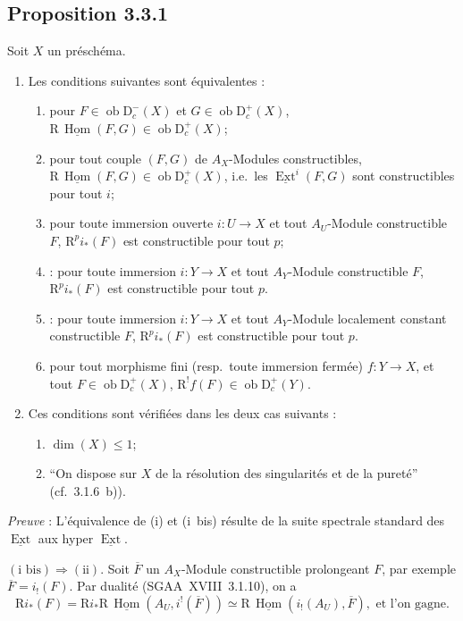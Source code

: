 \documentclass[11pt]{article}
\DeclareMathOperator{\Hom}{Hom}
\DeclareMathOperator{\Ext}{Ext}
\newcommand{\R}{\mathrm{R}}\newcommand{\RHomCore}{\mathrm{RHom}}
\newcommand{\D}{\mathrm{D}}
\newcommand{\ob}{\operatorname{ob}}
\newcommand{\ol}[1]{\overline{#1}}
\providecommand{\Hom}{\operatorname{Hom}}
\providecommand{\ob}{\operatorname{ob}}
\providecommand{\R}{\mathrm R}
\providecommand{\Hom}{\operatorname{Hom}}
\begin{document}
\subsection*{Proposition 3.3.1}
Soit $X$ un préschéma.
\begin{enumerate}
\item[a)] Les conditions suivantes sont équivalentes :
\begin{enumerate}
\item[(i)] pour $F \in \ob \D_c^{-}(X)$ et $G \in \ob \D_c^{+}(X)$, $\R\,\underline{\Hom}(F,G) \in \ob \D_c^{+}(X)$;
\item[(i~bis)] pour tout couple $(F,G)$ de $A_X$-Modules constructibles, $\R\,\underline{\Hom}(F,G) \in \ob \D_c^{+}(X)$, i.e.~les $\underline{\Ext}^i(F,G)$ sont constructibles pour tout $i$;
\item[(ii)] pour
toute immersion ouverte $i : U \to X$ et tout $A_U$-Module constructible $F$, $\mathrm{R}^p i_{*}(F)$ est constructible pour tout $p$;
\item[(ii~bis)] : pour toute immersion $i : Y \to X$ et tout $A_Y$-Module constructible $F$, $\mathrm{R}^p i_{*}(F)$ est constructible pour tout $p$.
\item[(ii~ter)] : pour toute immersion $i : Y \to X$ et tout $A_Y$-Module localement constant constructible $F$, $\mathrm{R}^p i_{*}(F)$ est constructible pour tout $p$.
\item[(iii)] pour tout morphisme fini (resp.~toute immersion fermée) $f : Y \to X$, et tout $F \in \ob \D_c^{+}(X)$, $\R^{!}f(F) \in \ob \D_c^{+}(Y)$.
\end{enumerate}
\item[b)] Ces conditions sont vérifiées dans les deux cas suivants :
\begin{enumerate}
\item[(i)] $\dim(X) \leqslant 1$;
\item[(ii)] ``On dispose sur $X$ de la résolution des singularités et de la pureté'' (cf.~3.1.6~b)).
\end{enumerate}
\end{enumerate}

\emph{Preuve} : L'équivalence de (i) et (i~bis) résulte de la suite spectrale standard des $\underline{\Ext}$ aux hyper $\underline{\Ext}$.

$(\text{i~bis}) \Rightarrow (\text{ii})$. Soit $\ol{F}$ un $A_X$-Module constructible prolongeant $F$, par exemple $\ol{F} = i_{!}(F)$. Par dualité (SGAA~XVIII~3.1.10), on a
\[
\R i_{*}(F) = \R i_{*} \R\,\underline{\Hom}(A_U, i^{!}(\ol{F})) \simeq \R\,\underline{\Hom}(i_{!}(A_U), \ol{F}), \text{ et l'on gagne.}
\]
\end{document}
